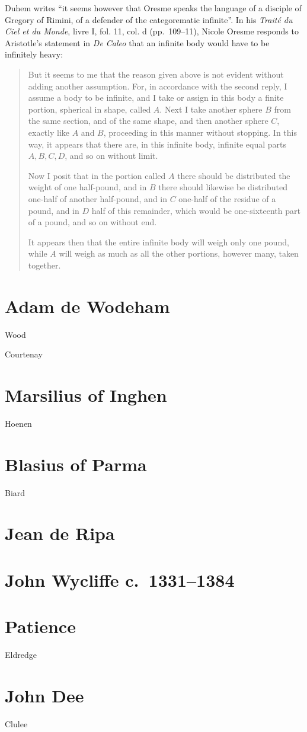\documentclass{article}
\begin{document}
Duhem writes \cite[p.~126]{ariew} ``it seems however that Oresme speaks the language of a disciple of Gregory of Rimini, of a defender of the categorematic infinite''. 
In his {\em Trait\'e du Ciel et du Monde},
livre I, fol. 11, col. d (pp.~109--11),
 Nicole Oresme responds to Aristotle's statement in {\em De Caleo} that an infinite body would have to be infinitely heavy: \cite[p.~127]{ariew}
\begin{quote}
But it seems to me that the reason given above is not evident without adding another assumption. For, in accordance with the second reply, I assume a body to be infinite,
and I take or assign in this body a finite portion, spherical in shape, called $A$. Next I take another sphere $B$ from the same section, and of the same shape,
and then another sphere $C$, exactly like $A$ and $B$, proceeding in this manner without stopping. In this way, it appears that there are, in this infinite body,
infinite equal parts $A,B,C,D$, and so on without limit.

Now I posit that in the portion called $A$ there should be distributed the weight of one half-pound, and in $B$ there should likewise be distributed one-half
of another half-pound, and in $C$ one-half of the residue of a pound, and in $D$ half of this remainder, which would be one-sixteenth part of a pound, and so on without
end.

It appears then that the entire infinite body will weigh only one pound, while $A$ will weigh as much as all the other portions, however many, taken
together.
\end{quote}


\section{Adam de Wodeham}
Wood \cite{wodeham}

Courtenay \cite{courtenay1978}

\section{Marsilius of Inghen}
Hoenen \cite{hoenen}

\section{Blasius of Parma}
Biard \cite{blasius}

\section{Jean de Ripa}

\section{John Wycliffe c.~1331--1384}

\section{Patience}
Eldredge \cite{eldredge}

\section{John Dee}
Clulee \cite{johndee}

\nocite{*}



\end{document}
